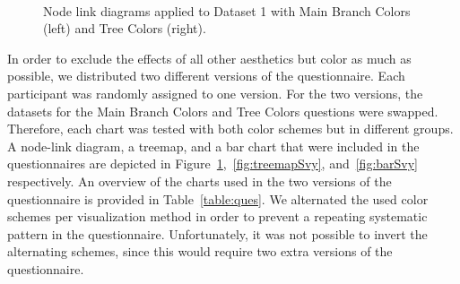 \documentclass[journal]{vgtc}                %
\begin{document}
\begin{figure}[tb]
  \centering
  \mbox{
  }
  \caption{Node link diagrams applied to Dataset 1 with Main Branch Colors (left) and Tree Colors (right).}\label{fig:graphSvy}

\end{figure}

In order to exclude the effects of all other aesthetics but color as much as possible, we distributed two different versions of the questionnaire. Each participant was randomly assigned to one version. For the two versions, the datasets for the Main Branch Colors and Tree Colors questions were swapped. Therefore, each chart was tested with both color schemes but in different groups. A node-link diagram, a treemap, and a bar chart that were included in the questionnaires are depicted in Figure~\ref{fig:graphSvy},~\ref{fig:treemapSvy}, and~\ref{fig:barSvy} respectively. An overview of the charts used in the two versions of the questionnaire is provided in Table~\ref{table:ques}. We alternated the used color schemes per visualization method in order to prevent a repeating systematic pattern in the questionnaire. Unfortunately, it was not possible to invert the alternating schemes, since this would require two extra versions of the questionnaire.
\end{document}

